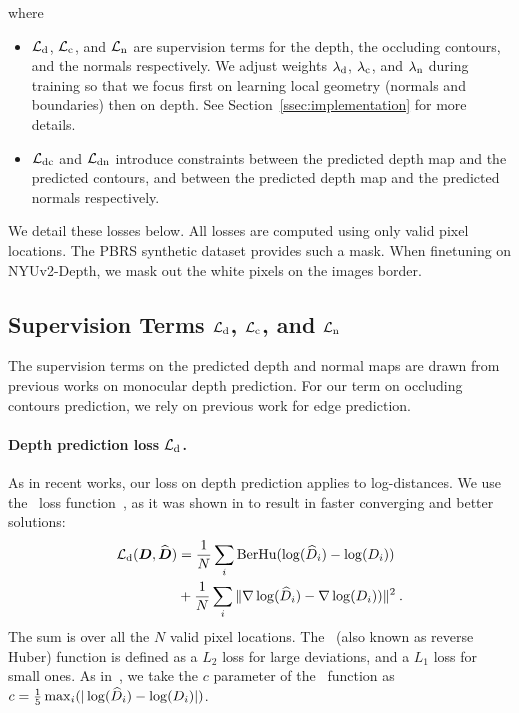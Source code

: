 \documentclass[10pt,twocolumn,letterpaper]{article}
\begin{document}
where
\begin{itemize}
\item $\mathcal{L}_{\text{d}}$, $\mathcal{L}_{\text{c}}$, and $\mathcal{L}_{\text{n}}$ are  
supervision terms for the depth, the occluding contours, and the normals 
respectively. We     adjust    weights     $\lambda_{\text{d}}$,   
$\lambda_{\text{c}}$,     and $\lambda_{\text{n}}$ during  training so  that we 
focus  first on  learning local geometry     (normals     and     
boundaries)    then     on     depth.      See 
Section~\ref{ssec:implementation}  for  more details.
\item $\mathcal{L}_{\text{dc}}$ and $\mathcal{L}_{\text{dn}}$ introduce constraints between the predicted
  depth map and the predicted contours, and between the predicted depth map and the
  predicted normals respectively.
\end{itemize}
We detail these losses below. All losses are computed using only valid pixel 
locations.  The PBRS synthetic dataset provides such a mask.  When finetuning 
on NYUv2-Depth, we mask out the white pixels on the 
images border.



\subsection{Supervision Terms $\mathcal{L}_{\text{d}}$, $\mathcal{L}_{\text{c}}$, and 
$\mathcal{L}_{\text{n}}$}

The supervision  terms on  the predicted  depth and normal  maps are  drawn from
previous  works  on monocular  depth  prediction.   For  our term  on  occluding
contours prediction, we rely on previous work for edge prediction.


\paragraph{Depth prediction loss $\mathcal{L}_{\text{d}}$.}

As in recent  works, our loss on depth prediction  applies to log-distances.  We
use  the \BerHu~loss  function~\cite{BerHuOwen,BerHuZwald}, as  it  was
shown in \cite{Laina2016DeeperDP}  to result in faster converging
and better solutions:
\begin{equation}
  \begin{aligned}
    \mathcal{L}_{\text{d}}(\boldsymbol{D}, \widehat{\boldsymbol{D}}) &= \frac{1}{N}\sum_i \text{BerHu}(\log(\widehat{D}_i) - 
    \log(D_i))\\&+ \frac{1}{N} \sum_i \|\nabla\log(\widehat{D}_i) -
    \nabla\log(D_i))\|^2\> .
  \end{aligned}
\end{equation}
The sum is  over all the $N$  valid pixel locations.  The  \BerHu~(also known as
reverse Huber) function is  defined as a $L_2$ loss for  large deviations, and a
$L_1$  loss for  small ones.   As in~\cite{Laina2016DeeperDP},  we take  the $c$
parameter  of   the  \BerHu~function  as  $c=\frac{1}{5}   \max_i(|\log(\widehat{D}_i)  -
\log(D_i)|)$.
\end{document}
